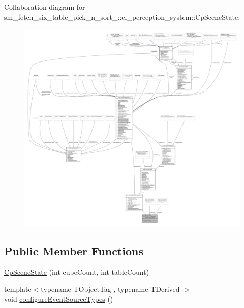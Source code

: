 Collaboration diagram for sm\+\_\+fetch\+\_\+six\+\_\+table\+\_\+pick\+\_\+n\+\_\+sort\+\_\+:\+:cl\+\_\+perception\+\_\+system\+:\+:Cp\+Scene\+State\+:
\nopagebreak
\begin{figure}[H]
\begin{center}
\leavevmode
\includegraphics[width=350pt]{classsm__fetch__six__table__pick__n__sort__1_1_1cl__perception__system_1_1CpSceneState__coll__graph}
\end{center}
\end{figure}
\subsection*{Public Member Functions}
\begin{DoxyCompactItemize}
\item 
\hyperlink{classsm__fetch__six__table__pick__n__sort__1_1_1cl__perception__system_1_1CpSceneState_a5564b8dae914a5567b6ccb671fd878ce}{Cp\+Scene\+State} (int cube\+Count, int table\+Count)
\item 
{\footnotesize template$<$typename T\+Object\+Tag , typename T\+Derived $>$ }\\void \hyperlink{classsm__fetch__six__table__pick__n__sort__1_1_1cl__perception__system_1_1CpSceneState_a8852f8c1ad707b55a8869974a76cf9a7}{configure\+Event\+Source\+Types} ()
\end{DoxyCompactItemize}
